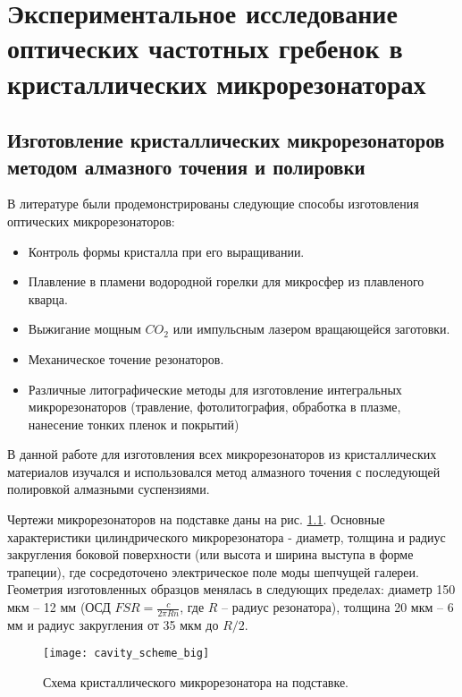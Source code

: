 \chapter{Экспериментальное исследование оптических частотных гребенок в кристаллических микрорезонаторах} \label{chapt3}

\section{Изготовление кристаллических микрорезонаторов методом алмазного точения и полировки}

В литературе были продемонстрированы следующие способы изготовления оптических микрорезонаторов:

\begin{itemize}
  \item Контроль формы кристалла при его выращивании.
  \item Плавление в пламени водородной горелки для микросфер из плавленого кварца.
  \item Выжигание мощным $CO_2$ или импульсным лазером вращающейся заготовки.
  \item Механическое точение резонаторов.
  \item Различные литографические методы для изготовление интегральных микрорезонаторов (травление, фотолитография, обработка в плазме, нанесение тонких пленок и покрытий)
\end{itemize}

В данной работе для изготовления всех микрорезонаторов из кристаллических материалов изучался и использовался метод алмазного точения с последующей полировкой алмазными суспензиями.

Чертежи микрорезонаторов на подставке даны на рис. \ref{cavity_scheme_big}. Основные характеристики цилиндрического микрорезонатора - диаметр, толщина и радиус закругления боковой поверхности (или высота и ширина выступа в форме трапеции), где сосредоточено электрическое поле моды шепчущей галереи. Геометрия изготовленных образцов менялась в следующих пределах: диаметр 150 мкм – 12 мм (ОСД $FSR= \frac{c}{2\pi Rn}$, где $R$ – радиус резонатора), толщина 20 мкм – 6 мм и радиус закругления от 35 мкм до $R/2$.

\begin{figure}[ht]
    \centering
  \texttt{[image: cavity\_scheme\_big]}
  \caption{Схема кристаллического микрорезонатора на подставке.}
  \label{cavity_scheme_big}
\end{figure}

